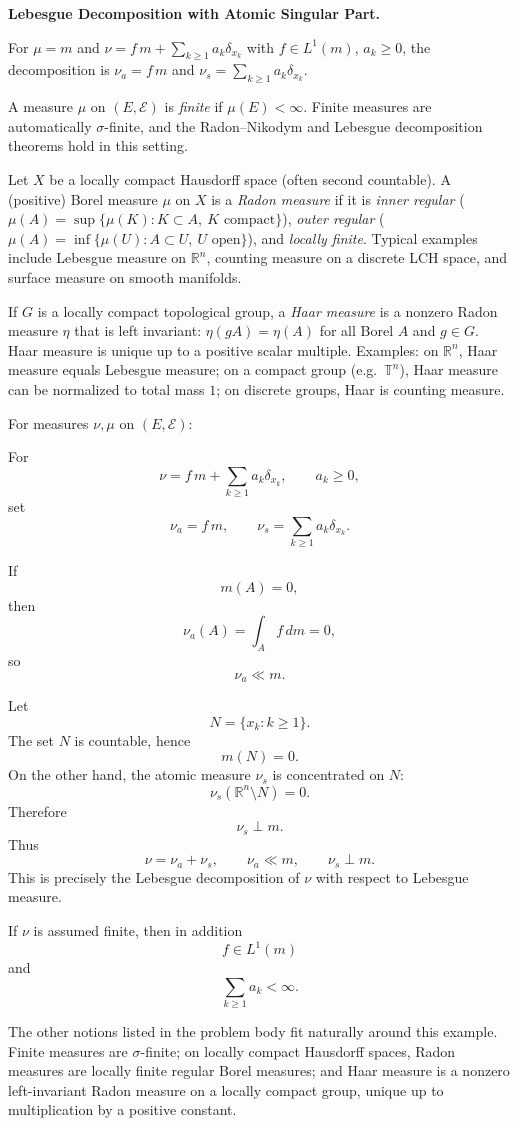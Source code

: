 \begin{problem}[CP-II-0203]
\label{prob:cp-ii-0203}
\textbf{Lebesgue Decomposition with Atomic Singular Part.}

\hspace*{1.5em}For $\mu=m$ and $\nu=f\,m+\sum_{k\ge1} a_k\delta_{x_k}$ with $f\in L^1(m)$, $a_k\ge0$,
		the decomposition is $\nu_a=f\,m$ and $\nu_s=\sum_{k\ge1} a_k\delta_{x_k}$.

	A measure $\mu$ on $(E,\mathcal E)$ is \emph{finite} if $\mu(E)<\infty$.
	Finite measures are automatically $\sigma$-finite, and the Radon--Nikodym and
	Lebesgue decomposition theorems hold in this setting.

	\bigskip

	Let $X$ be a locally compact Hausdorff space (often second countable).
	A (positive) Borel measure $\mu$ on $X$ is a \emph{Radon measure} if it is
	\emph{inner regular} ($\mu(A)=\sup\{\mu(K):K\subset A,~K\text{ compact}\}$),
	\emph{outer regular} ($\mu(A)=\inf\{\mu(U):A\subset U,~U\text{ open}\}$),
	and \emph{locally finite}. Typical examples include Lebesgue measure on
	$\mathbb R^n$, counting measure on a discrete LCH space, and surface measure on smooth manifolds.

	\bigskip

	If $G$ is a locally compact topological group, a \emph{Haar measure} is a nonzero
	Radon measure $\eta$ that is left invariant: $\eta(gA)=\eta(A)$ for all Borel $A$ and $g\in G$.
	Haar measure is unique up to a positive scalar multiple.
	Examples: on $\mathbb R^n$, Haar measure equals Lebesgue measure; on a compact group
	(e.g.\ $\mathbb T^n$), Haar measure can be normalized to total mass $1$; on discrete groups, Haar is counting measure.

	\bigskip

	For measures $\nu,\mu$ on $(E,\mathcal E)$:
\end{problem}

\begin{solution}
For
\[
\nu
=
f\,m+\sum_{k\ge1}a_k\delta_{x_k},
\qquad
a_k\ge0,
\]
set
\[
\nu_a=f\,m,
\qquad
\nu_s=\sum_{k\ge1}a_k\delta_{x_k}.
\]

If
\[
m(A)=0,
\]
then
\[
\nu_a(A)
=
\int_A f\,dm
=
0,
\]
so
\[
\nu_a\ll m.
\]

Let
\[
N=\{x_k:k\ge1\}.
\]
The set \(N\) is countable, hence
\[
m(N)=0.
\]
On the other hand, the atomic measure \(\nu_s\) is concentrated on \(N\):
\[
\nu_s(\mathbb R^n\setminus N)=0.
\]
Therefore
\[
\nu_s\perp m.
\]
Thus
\[
\boxed{
\nu=\nu_a+\nu_s,
\qquad
\nu_a\ll m,
\qquad
\nu_s\perp m.
}
\]
This is precisely the Lebesgue decomposition of \(\nu\) with respect to Lebesgue measure.

If \(\nu\) is assumed finite, then in addition
\[
f\in L^1(m)
\]
and
\[
\sum_{k\ge1}a_k<\infty.
\]

The other notions listed in the problem body fit naturally around this example. Finite measures are \(\sigma\)-finite; on locally compact Hausdorff spaces, Radon measures are locally finite regular Borel measures; and Haar measure is a nonzero left-invariant Radon measure on a locally compact group, unique up to multiplication by a positive constant.
\end{solution}



